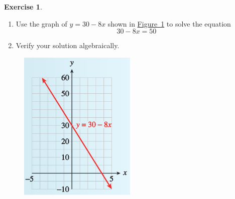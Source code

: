 \documentclass[10pt,]{book}
\theoremstyle{plain}
\theoremstyle{definition}
\newtheorem{exercise}[theorem]{Exercise}
\theoremstyle{definition}
\numberwithin{equation}{section}
\begin{document}
\begin{exercise}\label{exercise-graph-to-solve}
\leavevmode%
\begin{enumerate}[label=*\alph**]
\item\hypertarget{li-138}{}Use the graph of \(y = 30 − 8x\) shown in \hyperref[fig-graph-to-solve2]{Figure~\ref{fig-graph-to-solve2}} to solve the equation \begin{equation*}30 − 8x = 50\end{equation*}\item\hypertarget{li-139}{}Verify your solution algebraically.\end{enumerate}
\leavevmode%
\begin{figure}
\centering
\includegraphics[width=0.50\textwidth,]{images/fig-graph-to-solve2.svg}\caption{\label{fig-graph-to-solve2}}
\end{figure}
\end{exercise}
\leavevmode%
\end{document}
